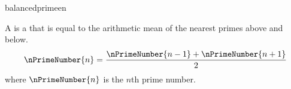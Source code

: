\begin{mhmodnl}[creators=jusche]{balancedprime}{en}
\begin{definition}
  A  is a  
  that is equal to the arithmetic mean of the nearest primes above and below.
  \[\nPrimeNumber{n} = \frac{\nPrimeNumber{n - 1} + \nPrimeNumber{n + 1}}{2}\]
  where $\nPrimeNumber{n}$ is the $n$th prime number.
\end{definition}
\end{mhmodnl}


